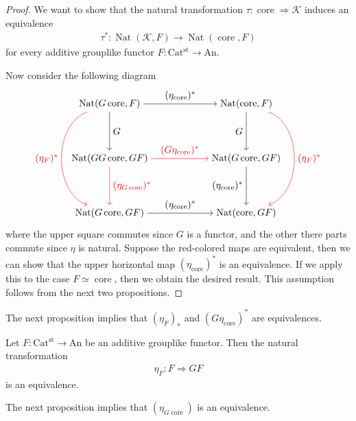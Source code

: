\documentclass[a4paper,dvipdfmx,11pt,reqno]{amsart}
\DeclareMathOperator{\Nat}{Nat}
\DeclareMathOperator{\core}{core}
\newcommand{\K}{\mathcal{K}}
\newcommand{\An}{\mathrm{An}}
\newcommand{\Catst}{\mathrm{Cat^{st}}}
\begin{document}
\begin{proof}
  We want to show that the natural transformation $\tau : \core \Rightarrow \K$ induces an equivalence
  \begin{align*}
    \tau^{\ast} : \Nat(\K,F) \to \Nat(\core,F)
  \end{align*}
  for every additive grouplike functor $F : \Catst \to \An$.
  
  Now consider the following diagram 
  \[\begin{tikzpicture}[auto,->]
    \node (tl) at (0,4) {$\Nat(G\core,F)$};
    \node (tr) at (5,4) {$\Nat(\core,F)$};
    \node (ml) at (0,2) {$\Nat(GG\core,GF)$};
    \node (mr) at (5,2) {$\Nat(G\core,GF)$};
    \node (bl) at (0,0) {$\Nat(G\core,GF)$};
    \node (br) at (5,0) {$\Nat(\core,GF)$};
    \draw (tl) -- node {$(\eta_{\core})^\ast$} (tr);
    \draw[red] (ml) -- node {$(G\eta_{\core})^\ast$} (mr);
    \draw (bl) -- node {$(\eta_{\core})^\ast$} (br);
    \draw (tl) -- node {$G$} (ml);
    \draw[red] (ml) -- node {$(\eta_{G\core})^\ast$} (bl);
    \draw (tr) -- node[swap] {$G$} (mr);
    \draw (mr) -- node[swap] {$(\eta_{\core})^\ast$} (br); 
    \draw[bend right=70,red] (tl) to node[swap] {$(\eta_{F})^\ast$} (bl);
    \draw[bend left=70,red] (tr) to node {$(\eta_{F})^\ast$} (br);
  \end{tikzpicture}\]
  where the upper square commutes since $G$ is a functor, and the other there parts commute since $\eta$ is natural.
  Suppose the red-colored maps are equivalent, then we can show that the upper horizontal map $(\eta_{\core})^\ast$ is an equivalence.
  If we apply this to the case $F \simeq \core$, then we obtain the desired result.
  This assumption follows from the next two propositions.
\end{proof}

The next proposition implies that $(\eta_{F})_{\ast}$ and $(G\eta_{\core})^{\ast}$ are equivalences.

\begin{proposition}
  Let $F : \Catst \to \An$ be an additive grouplike functor.
  Then the natural transformation
  \begin{align*}
    \eta_{F} : F \Rightarrow GF
  \end{align*}
  is an equivalence. 
\end{proposition}

The next proposition implies that $(\eta_{G\core})$ is an equivalence.
\end{document}
